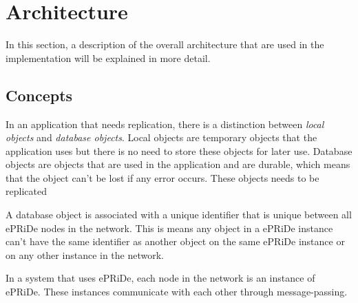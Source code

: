 
\section{Architecture} %
\label{sec:arch}

In this section, a description of the overall architecture that are used in the implementation will be explained in more detail.  

\subsection{Concepts} %
\label{sub:consepts}
In an application that needs replication, there is a distinction between \emph{local objects} and \emph{database objects}. Local objects are temporary objects that the application uses but there is no need to store these objects for later use. Database objects are objects that are used in the application and are durable, which means that the object can't be lost if any error occurs. These objects needs to be replicated 

A database object is associated with a unique identifier that is unique between all ePRiDe nodes in the network. This is means any object in a ePRiDe instance can't have the same identifier as another object on the same ePRiDe instance or on any other instance in the network.    


In a system that uses ePRiDe, each node in the network is an instance of ePRiDe. These instances communicate with each other through message-passing. 

%




%	
